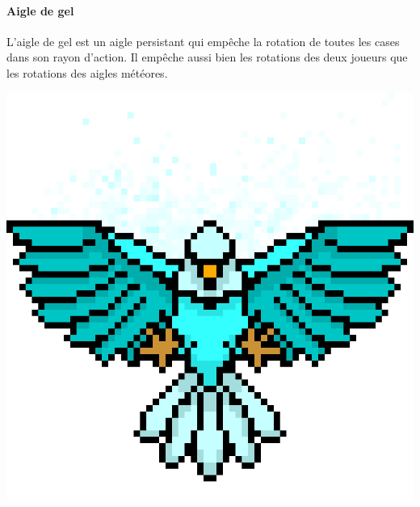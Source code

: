 \begin{minipage}{.75\textwidth}
    \paragraph{Aigle de gel}\label{sec:gel}
    L'aigle de gel est un aigle persistant qui empêche la rotation de toutes les
    cases dans son rayon d'action. %
    Il empêche aussi bien les rotations des deux joueurs que les rotations des
    aigles météores.
\end{minipage}
\begin{minipage}{.2\textwidth}
    \centering
    \includegraphics[width=.8\textwidth]{img/sprites/aigle_glace.png}
\end{minipage}

